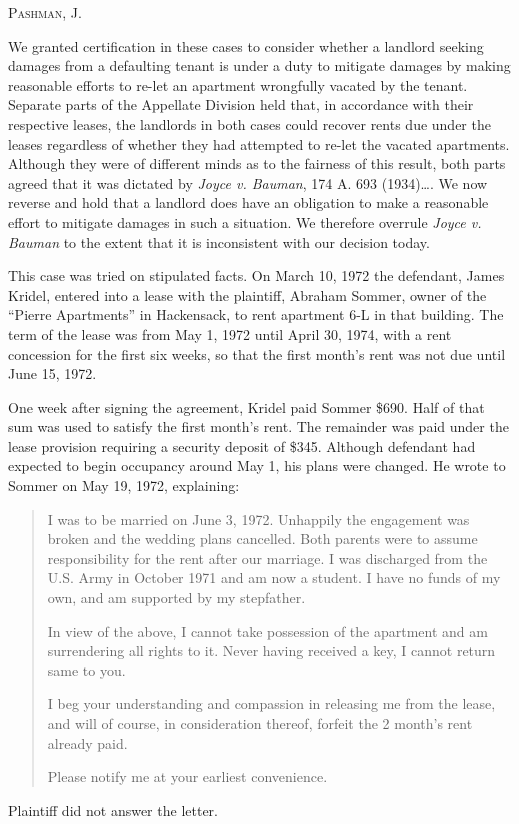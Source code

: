 

\textsc{Pashman}, J.

We granted certification in these cases to consider whether a landlord seeking
damages from a defaulting tenant is under a duty to mitigate damages by making
reasonable efforts to re-let an apartment wrongfully vacated by the tenant.
Separate parts of the Appellate Division held that, in accordance with their
respective leases, the landlords in both cases could recover rents due under
the leases regardless of whether they had attempted to re-let the vacated
apartments. Although they were of different minds as to the fairness of this
result, both parts agreed that it was dictated by \textit{Joyce v. Bauman}, 174
A. 693 (1934)\ldots.  We now reverse and hold that a landlord does have an
obligation to make a reasonable effort to mitigate damages in such a situation.
We therefore overrule \textit{Joyce v. Bauman} to the extent that it is
inconsistent with our decision today.


This case was tried on stipulated facts. On March 10, 1972 the defendant, James
Kridel, entered into a lease with the plaintiff, Abraham Sommer, owner of the
``Pierre Apartments'' in Hackensack, to rent apartment 6-L in that building.
The term of the lease was from May 1, 1972 until April 30, 1974, with a rent
concession for the first six weeks, so that the first month's rent was not due
until June 15, 1972.


One week after signing the agreement, Kridel paid Sommer \$690. Half of that sum
was used to satisfy the first month's rent. The remainder was paid under the
lease provision requiring a security deposit of \$345. Although defendant had
expected to begin occupancy around May 1, his plans were changed. He wrote to
Sommer on May 19, 1972, explaining:
\begin{quotation}
I was to be married on June 3, 1972. Unhappily the engagement was broken and the
wedding plans cancelled. Both parents were to assume responsibility for the
rent after our marriage. I was discharged from the U.S. Army in October 1971
and am now a student. I have no funds of my own, and am supported by my
stepfather.

In view of the above, I cannot take possession of the apartment and am
surrendering all rights to it. Never having received a key, I cannot return
same to you.

I beg your understanding and compassion in releasing me from the lease, and will
of course, in consideration thereof, forfeit the 2 month's rent already paid.

Please notify me at your earliest convenience.
\end{quotation}
Plaintiff did not answer the letter.

